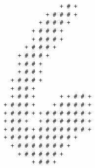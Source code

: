 \begin{multicols*}{2}
\begin{Verbatim}[samepage=true]
                                                        
\end{Verbatim}
\begin{Verbatim}[samepage=true]
                                                        
                                                        
                                + # +                   
                            + # # # +                   
                          + # # # +                     
                        + # # # +                       
                        + # # # +                       
                      + # # # +                         
                    + # # # +                           
                    + # # +                             
                    + # # +                             
                  + # # # +                             
                  + # # +                               
                  + # # +       + + # # +               
                + # # # +     + # # # # +               
                + # # # + + # # # # # # +               
                + # # +   + # # # # # # +               
                + # # # + # # # # # # # +               
                + # # # # # # # # # +                   
                  + # # # # # # # +                     
                    + # # # # # +                       
                        + # # +                         
                                                        
                                                        
                                                        
\end{Verbatim}
\begin{Verbatim}[samepage=true]
                                                        
                                                        
                                                        

\end{Verbatim}
\end{multicols*}
